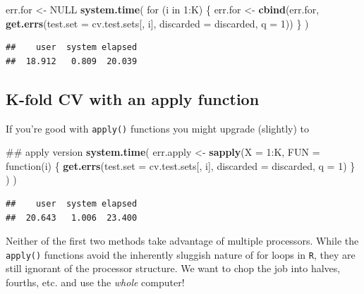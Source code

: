 \documentclass[]{article}
\newenvironment{Shaded}{\begin{snugshade}}{\end{snugshade}}
\newcommand{\KeywordTok}[1]{\textcolor[rgb]{0.13,0.29,0.53}{\textbf{{#1}}}}
\newcommand{\DataTypeTok}[1]{\textcolor[rgb]{0.13,0.29,0.53}{{#1}}}
\newcommand{\DecValTok}[1]{\textcolor[rgb]{0.00,0.00,0.81}{{#1}}}
\newcommand{\StringTok}[1]{\textcolor[rgb]{0.31,0.60,0.02}{{#1}}}
\newcommand{\OtherTok}[1]{\textcolor[rgb]{0.56,0.35,0.01}{{#1}}}
\newcommand{\NormalTok}[1]{{#1}}
\begin{document}
\begin{Shaded}
\begin{Highlighting}[]
\NormalTok{err.for <-}\StringTok{ }\OtherTok{NULL}
\KeywordTok{system.time}\NormalTok{(}
    \NormalTok{for (i in }\DecValTok{1}\NormalTok{:K) \{}
        \NormalTok{err.for <-}\StringTok{ }\KeywordTok{cbind}\NormalTok{(err.for, }\KeywordTok{get.errs}\NormalTok{(}\DataTypeTok{test.set =} \NormalTok{cv.test.sets[, i],}
                                           \DataTypeTok{discarded =} \NormalTok{discarded,}
                                           \DataTypeTok{q =} \DecValTok{1}\NormalTok{))}
        \NormalTok{\}}
    \NormalTok{)}
\end{Highlighting}
\end{Shaded}

\begin{verbatim}
##    user  system elapsed 
##  18.912   0.809  20.039
\end{verbatim}

\subsection{K-fold CV with an apply
function}\label{k-fold-cv-with-an-apply-function}

If you're good with \texttt{apply()} functions you might upgrade
(slightly) to

\begin{Shaded}
\begin{Highlighting}[]
\NormalTok{## apply version}
\KeywordTok{system.time}\NormalTok{(}
    \NormalTok{err.apply <-}\StringTok{ }\KeywordTok{sapply}\NormalTok{(}\DataTypeTok{X =} \DecValTok{1}\NormalTok{:K, }
                        \DataTypeTok{FUN =} \NormalTok{function(i) \{}
                            \KeywordTok{get.errs}\NormalTok{(}\DataTypeTok{test.set =} \NormalTok{cv.test.sets[, i],}
                                     \DataTypeTok{discarded =} \NormalTok{discarded,}
                                     \DataTypeTok{q =} \DecValTok{1}\NormalTok{)}
                            \NormalTok{\}}
                        \NormalTok{)}
    \NormalTok{)}
\end{Highlighting}
\end{Shaded}

\begin{verbatim}
##    user  system elapsed 
##  20.643   1.006  23.400
\end{verbatim}

Neither of the first two methods take advantage of multiple processors.
While the \texttt{apply()} functions avoid the inherently sluggish
nature of for loops in \texttt{R}, they are still ignorant of the
processor structure. We want to chop the job into halves, fourths, etc.
and use the \emph{whole} computer!
\end{document}
